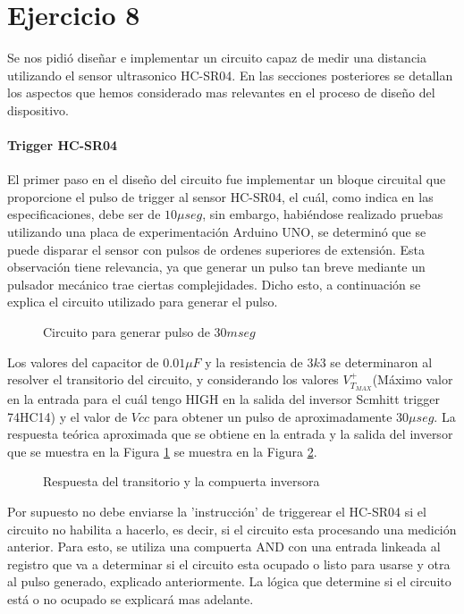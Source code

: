 \newpage
\part*{Ejercicio 8}

Se nos pidió diseñar e implementar un circuito capaz de medir una distancia utilizando el sensor ultrasonico HC-SR04. En las secciones posteriores se detallan los aspectos que hemos considerado mas relevantes en el proceso de diseño del dispositivo.

\subsection*{Trigger HC-SR04}

El primer paso en el diseño del circuito fue implementar un bloque circuital que proporcione el pulso de trigger al sensor HC-SR04, el cuál, como indica en las especificaciones, debe ser de $10 \mu seg$, sin embargo, habiéndose realizado pruebas utilizando una placa de experimentación Arduino UNO, se determinó que se puede disparar el sensor con pulsos de ordenes superiores de extensión. Esta observación tiene relevancia, ya que generar un pulso tan breve mediante un pulsador mecánico trae ciertas complejidades. Dicho esto, a continuación se explica el circuito utilizado para generar el pulso.
\bigskip

\begin{figure}[H]
\begin{center}

\end{center}
\caption{Circuito para generar pulso de $30 mseg$} \label{8_fig1}
\end{figure}

Los valores del capacitor de $0.01\mu F$ y la resistencia de $3k3$ se determinaron al resolver el transitorio del circuito, y considerando los valores $V_{T_{MAX}}^+$(Máximo valor en la entrada para el cuál tengo HIGH en la salida del inversor Scmhitt trigger 74HC14) y el valor de $Vcc$ para obtener un pulso de aproximadamente $30 \mu seg$. La respuesta teórica aproximada que se obtiene en la entrada y la salida del inversor que se muestra en la Figura \ref{8_fig1} se muestra en la Figura \ref{8_fig2}.

\begin{figure}[H]
\centering

\caption{Respuesta del transitorio y la compuerta inversora} 
\label{8_fig2}
\end{figure}

Por supuesto no debe enviarse la 'instrucción' de triggerear el HC-SR04 si el circuito no habilita a hacerlo, es decir, si el circuito esta procesando una medición anterior. Para esto, se utiliza una compuerta AND con una entrada linkeada al registro que va a determinar si el circuito esta ocupado o listo para usarse y otra al pulso generado, explicado anteriormente. La lógica que determine si el circuito está o no ocupado se explicará mas adelante.


